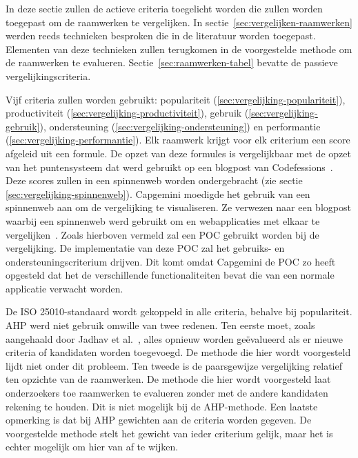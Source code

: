 In deze sectie zullen de actieve criteria toegelicht worden die zullen worden toegepast om de raamwerken te vergelijken.
In sectie~\ref{sec:vergelijken-raamwerken} werden reeds technieken besproken die in de literatuur worden toegepast.
Elementen van deze technieken zullen terugkomen in de voorgestelde methode om de raamwerken te evalueren.
Sectie~\ref{sec:raamwerken-tabel} bevatte de passieve vergelijkingscriteria.

Vijf criteria zullen worden gebruikt: populariteit (\ref{sec:vergelijking-populariteit}), productiviteit (\ref{sec:vergelijking-productiviteit}), gebruik (\ref{sec:vergelijking-gebruik}), ondersteuning (\ref{sec:vergelijking-ondersteuning}) en performantie (\ref{sec:vergelijking-performantie}). 
Elk raamwerk krijgt voor elk criterium een score afgeleid uit een formule. 
De opzet van deze formules is vergelijkbaar met de opzet van het puntensysteem dat werd gebruikt op een blogpost van Codefessions~\cite{Sarrafi2012a}. 
Deze scores zullen in een spinnenweb worden ondergebracht (zie sectie \ref{sec:vergelijking-spinnenweb}).
Capgemini moedigde het gebruik van een spinnenweb aan om de vergelijking te visualiseren.
Ze verwezen naar een blogpost waarbij een spinnenweb werd gebruikt om  en webapplicaties met elkaar te vergelijken~\cite{Jeroen2012}.
Zoals hierboven vermeld zal een POC gebruikt worden bij de vergelijking.
De implementatie van deze POC zal het gebruiks- en ondersteuningscriterium drijven.  
Dit komt omdat Capgemini de POC zo heeft opgesteld dat het de verschillende functionaliteiten bevat die van een normale applicatie verwacht worden.

De ISO 25010-standaard wordt gekoppeld in alle criteria, behalve bij populariteit.
AHP werd niet gebruik omwille van twee redenen.
Ten eerste moet, zoals aangehaald door Jadhav et al.~\cite{Jadhav2009}, alles opnieuw worden geëvalueerd als er nieuwe criteria of kandidaten worden toegevoegd.
De methode die hier wordt voorgesteld lijdt niet onder dit probleem.
Ten tweede is de paarsgewijze vergelijking relatief ten opzichte van de raamwerken.
De methode die hier wordt voorgesteld laat onderzoekers toe raamwerken te evalueren zonder met de andere kandidaten rekening te houden.
Dit is niet mogelijk bij de AHP-methode.
Een laatste opmerking is dat bij AHP gewichten aan de criteria worden gegeven.
De voorgestelde methode stelt het gewicht van ieder criterium gelijk, maar het is echter mogelijk om hier van af te wijken.

